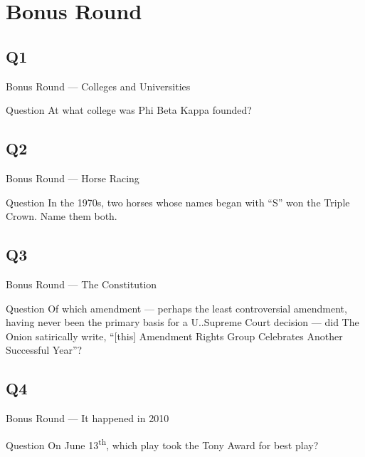 \documentclass[11pt]{beamer}
\begin{document}
\section{Bonus Round}
\subsection*{Q1}
\begin{frame}[t]{Bonus Round --- Colleges and Universities}
\vspace{-0.5em}
\begin{block}{Question}
At what college was Phi Beta Kappa founded?
\end{block}
\end{frame}
\subsection*{Q2}
\begin{frame}[t]{Bonus Round --- Horse Racing}
\vspace{-0.5em}
\begin{block}{Question}
In the 1970s, two horses whose names began with ``S'' won the Triple Crown.  Name them both.
\end{block}
\end{frame}
\subsection*{Q3}
\begin{frame}[t]{Bonus Round --- The Constitution}
\vspace{-0.5em}
\begin{block}{Question}
Of which amendment --- perhaps the least controversial amendment, having never been the primary basis for a U.\@S.\@ Supreme Court decision --- did The Onion satirically write, ``[this] Amendment Rights Group Celebrates Another Successful Year''?
\end{block}
\end{frame}
\subsection*{Q4}
\begin{frame}[t]{Bonus Round --- It happened in 2010}
\vspace{-0.5em}
\begin{block}{Question}
On June 13\textsuperscript{th}, which play took the Tony Award for best play?
\end{block}
\end{frame}
\end{document}
